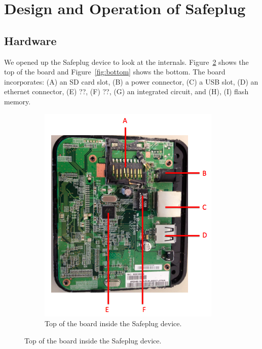 \section{Design and Operation of Safeplug}
\label{sec:design}

\subsection{Hardware}
We opened up the Safeplug device to look at the internals.  Figure~\ref{fig:top} shows the top of the board and Figure~\ref{fig:bottom} shows the bottom.  The board incorporates: (A) an SD card slot, (B) a power connector, (C) a USB slot, (D) an ethernet connector, (E) ??, (F) ??, (G) an integrated circuit, and (H), (I) flash memory.

\begin{figure}[htb]
\centering
\begin{subfigure}[b]{.3\textwidth}
  \includegraphics[width=\textwidth]{safeplug_listed_top}
  \caption{Top of the board inside the Safeplug device.}
  \label{fig:top}
\end{subfigure}%

\end{figure}
